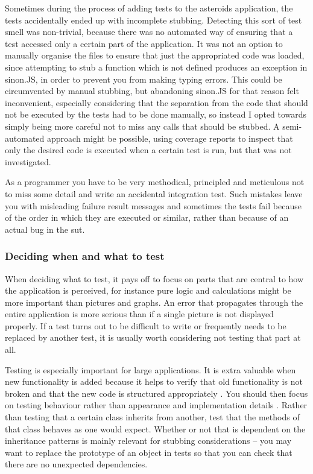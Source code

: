 \documentclass[11pt]{article}
\begin{document}
Sometimes during the process of adding tests to the asteroids application, the tests accidentally ended up with incomplete stubbing. Detecting this sort of test smell was non-trivial, because there was no automated way of ensuring that a test accessed only a certain part of the application. It was not an option to manually organise the files to ensure that just the appropriated code was loaded, since attempting to stub a function which is not defined produces an exception in sinon.JS, in order to prevent you from making typing errors. This could be circumvented by manual stubbing, but abandoning sinon.JS for that reason felt inconvenient, especially considering that the separation from the code that should not be executed by the tests had to be done manually, so instead I opted towards simply being more careful not to miss any calls that should be stubbed. A semi-automated approach might be possible, using coverage reports to inspect that only the desired code is executed when a certain test is run, but that was not investigated.

As a programmer you have to be very methodical, principled and meticulous not to miss some detail and write an accidental integration test. Such mistakes leave you with misleading failure result messages and sometimes the tests fail because of the order in which they are executed or similar, rather than because of an actual bug in the \gls{sut}.

\subsubsection{Deciding when and what to test}

When deciding what to test, it pays off to focus on parts that are central to how the application is perceived, for instance pure logic and calculations might be more important than pictures and graphs. An error that propagates through the entire application is more serious than if a single picture is not displayed properly. If a test turns out to be difficult to write or frequently needs to be replaced by another test, it is usually worth considering not testing that part at all. \cite[questions~9-10]{Edelstam}

Testing is especially important for large applications. It is extra valuable when new functionality is added because it helps to verify that old functionality is not broken and that the new code is structured appropriately \cite[questions~6-7]{Stenmark}. You should then focus on testing behaviour rather than appearance and implementation details \cite[question~10]{Edelstam}. Rather than testing that a certain class inherits from another, test that the methods of that class behaves as one would expect. Whether or not that is dependent on the inheritance patterns is mainly relevant for stubbing considerations -- you may want to replace the prototype of an object in tests so that you can check that there are no unexpected dependencies.
\end{document}
